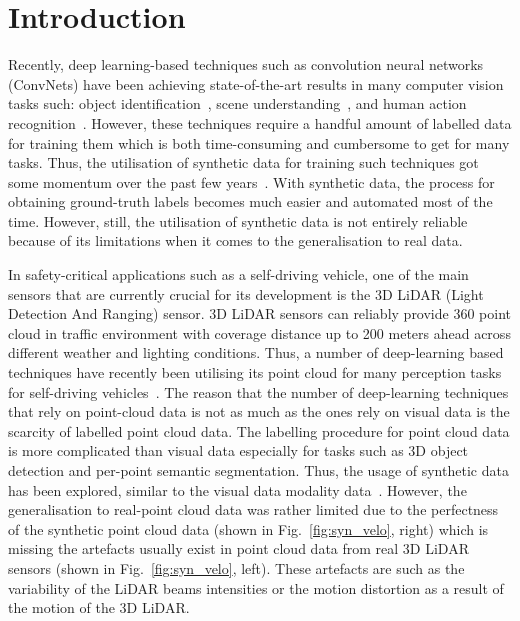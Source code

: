 \documentclass[letterpaper, 10 pt, conference]{IEEEtran}
\begin{document}
\section{Introduction}
Recently, deep learning-based techniques such as convolution neural networks (ConvNets) have been achieving state-of-the-art results in many computer vision tasks such: object identification~\cite{yolov3}, scene understanding~\cite{saleh2018end,saleh2018local}, and human action recognition~\cite{saleh2018cyclist,bakr2019fall,saleh2018long}. However, these techniques require a handful amount of labelled data for training them which is both time-consuming and cumbersome to get for many tasks. Thus, the utilisation of synthetic data for training such techniques got some momentum over the past few years~\cite{saleh2017cyclist,saleh2018effective}. With synthetic data, the process for obtaining ground-truth labels becomes much easier and automated most of the time. However, still, the utilisation of synthetic data is not entirely reliable because of its limitations when it comes to the generalisation to real data. 

\smallbreak
In safety-critical applications such as a self-driving vehicle, one of the main sensors that are currently crucial for its development is the 3D LiDAR (Light Detection And Ranging) sensor. 3D LiDAR sensors can reliably provide 360 point cloud  in traffic environment with coverage distance up to 200 meters ahead across different weather and lighting conditions. Thus, a number of deep-learning based techniques have recently been utilising its point cloud for many perception tasks for self-driving vehicles~\cite{yoon2018mapless,wu2018squeezesegv2}. The reason that the number of deep-learning techniques that rely on point-cloud data is not as much as the ones rely on visual data is the scarcity of labelled point cloud data. The labelling procedure for point cloud data is more complicated than visual data especially for tasks such as 3D object detection and per-point semantic segmentation. Thus, the usage of synthetic data has been explored, similar to the visual data modality data~\cite{saleh2017cyclist, yoon2018mapless}. However, the generalisation to real-point cloud data was rather limited due to the perfectness of the synthetic point cloud data (shown in Fig.~\ref{fig:syn_velo}, right) which is missing the artefacts usually exist in point cloud data from real 3D LiDAR sensors (shown in Fig.~\ref{fig:syn_velo}, left). These artefacts are such as the variability of the LiDAR beams intensities or the motion distortion as a result of the motion of the 3D LiDAR. 
\end{document}
